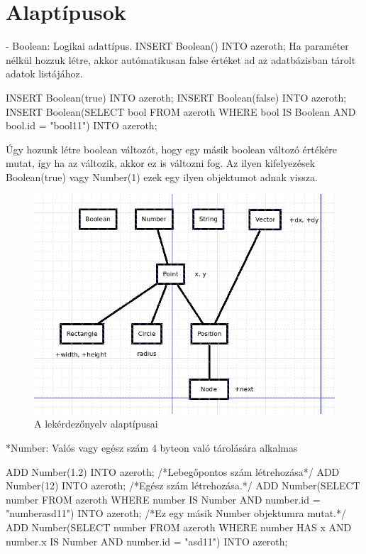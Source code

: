 
\section{Alaptípusok}

- Boolean: Logikai adattípus.
INSERT Boolean() INTO azeroth; 
Ha paraméter nélkül hozzuk létre, akkor autómatikusan false értéket ad az adatbázisban tárolt adatok listájához.

\begin{sql}
INSERT Boolean(true) INTO azeroth; 
INSERT Boolean(false) INTO azeroth;
INSERT Boolean(SELECT bool FROM azeroth WHERE bool IS Boolean AND bool.id = "bool11") INTO azeroth;
\end{sql}

Úgy hozunk létre boolean változót, hogy egy másik boolean változó értékére mutat, így ha az változik, akkor ez is változni fog.
Az ilyen kifelyezések Boolean(true) vagy Number(1) ezek egy ilyen objektumot adnak vissza.

\begin{figure}[htb]
\begin{center}
    \includegraphics[scale=0.5]{images/types}
    \caption{A lekérdezőnyelv alaptípusai}
    \label{fig:types}
\end{center}
\end{figure}

*Number: Valós vagy egész szám 4 byteon való tárolására alkalmas
\begin{sql}
ADD Number(1.2) INTO azeroth;  /*Lebegőpontos szám létrehozása*/
ADD Number(12) INTO azeroth;  /*Egész szám létrehozása.*/
ADD Number(SELECT number FROM azeroth WHERE number IS Number AND number.id = "numberasd11") INTO azeroth; /*Ez egy másik Number objektumra mutat.*/
ADD Number(SELECT number FROM azeroth WHERE number HAS x AND number.x IS Number AND number.id = "asd11") INTO azeroth;
\end{sql}

